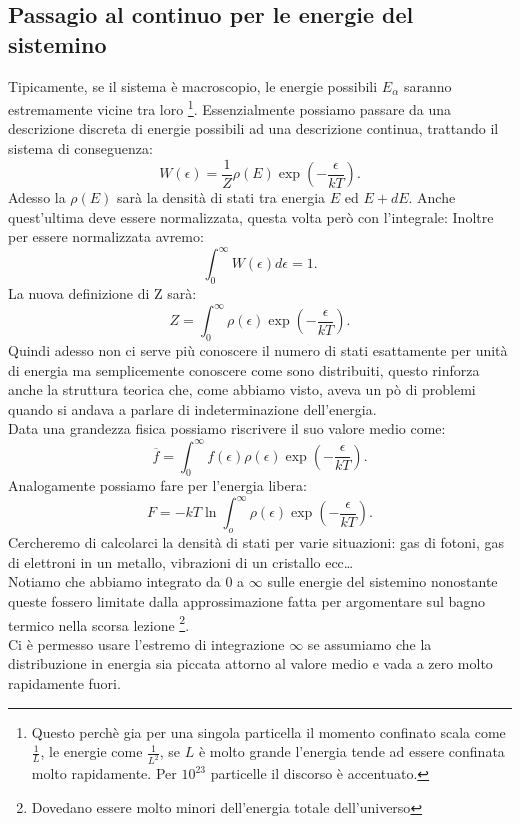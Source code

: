 \subsection{Passagio al continuo per le energie del sistemino}%
Tipicamente, se il sistema è macroscopio, le energie possibili $E_{\alpha}$ saranno estremamente vicine tra loro \footnote{Questo perchè gia per una singola particella il momento confinato scala come $\frac{1}{L}$, le energie come $\frac{1}{L^2}$, se $L$ è molto grande l'energia tende ad essere confinata molto rapidamente. Per $10^{23}$ particelle il discorso è accentuato.}. Essenzialmente possiamo passare da una descrizione discreta di energie possibili ad una descrizione continua, trattando il sistema di conseguenza:
\[
	W\left( \epsilon \right) = \frac{1}{Z} \rho\left( E \right) \exp \left(- \frac{\epsilon}{kT} \right) 
.\] 
Adesso la $\rho\left( E \right) $ sarà la densità di stati tra energia $E$ ed $E+dE$. Anche quest'ultima deve essere normalizzata, questa volta però con l'integrale:
Inoltre per essere normalizzata avremo:
\[
	\int_{0}^{\infty} W\left( \epsilon \right) d\epsilon = 1
.\] 
La nuova definizione di Z sarà:
\[
	Z = \int_{0}^{\infty}\rho\left( \epsilon \right) \exp\left( -\frac{\epsilon}{kT} \right) 
.\] \label{eq:DefZ}
Quindi adesso non ci serve più conoscere il numero di stati esattamente per unità di energia ma semplicemente conoscere come sono distribuiti, questo rinforza anche la struttura teorica che, come abbiamo visto, aveva un pò di problemi quando si andava a parlare di indeterminazione dell'energia.\\
Data una grandezza fisica possiamo riscrivere il suo valore medio come:
\[
    \overline{f} = \int_{0}^{\infty} f\left( \epsilon \right)\rho(\epsilon)\exp\left( -\frac{\epsilon}{kT} \right) 
.\] 
Analogamente possiamo fare per l'energia libera:
\[
	F = -kT \ln \int_{o}^{\infty} \rho\left( \epsilon \right) \exp\left( - \frac{\epsilon}{kT} \right) 
.\] 
Cercheremo di calcolarci la densità di stati per varie situazioni: gas di fotoni, gas di elettroni in un metallo, vibrazioni di un cristallo ecc\ldots\\
Notiamo che abbiamo integrato da 0 a $\infty$ sulle energie del sistemino nonostante queste fossero limitate dalla approssimazione fatta per argomentare sul bagno termico nella scorsa lezione \footnote{Dovedano essere molto minori dell'energia totale dell'universo}.\\
Ci è permesso usare l'estremo di integrazione $\infty$ se assumiamo che la distribuzione in energia sia piccata attorno al valore medio e vada a zero molto rapidamente fuori.\\
